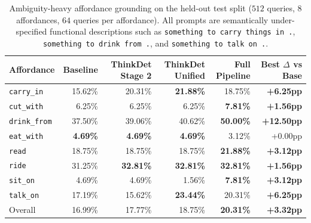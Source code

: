 \begin{table}[t]
\centering
\caption{Ambiguity-heavy affordance grounding on the held-out test split (\(512\) queries, \(8\) affordances, \(64\) queries per affordance). All prompts are semantically under-specified functional descriptions such as \texttt{something to carry things in .}, \texttt{something to drink from .}, and \texttt{something to talk on .}.}
\label{tab:ambiguity-affordance}
\begin{tabular}{lrrrrr}
\toprule
Affordance & Baseline & ThinkDet Stage 2 & ThinkDet Unified & Full Pipeline & Best \(\Delta\) vs Base \\
\midrule
\texttt{carry\_in}   & 15.62\% & 20.31\% & \textbf{21.88\%} & 18.75\% & \textbf{+6.25pp} \\
\texttt{cut\_with}   &  6.25\% &  6.25\% &  6.25\% & \textbf{7.81\%} & \textbf{+1.56pp} \\
\texttt{drink\_from} & 37.50\% & 39.06\% & 40.62\% & \textbf{50.00\%} & \textbf{+12.50pp} \\
\texttt{eat\_with}   & \textbf{4.69\%} & \textbf{4.69\%} & \textbf{4.69\%} & 3.12\% & +0.00pp \\
\texttt{read}        & 18.75\% & 18.75\% & 18.75\% & \textbf{21.88\%} & \textbf{+3.12pp} \\
\texttt{ride}        & 31.25\% & \textbf{32.81\%} & \textbf{32.81\%} & \textbf{32.81\%} & \textbf{+1.56pp} \\
\texttt{sit\_on}     &  4.69\% &  4.69\% &  1.56\% & \textbf{7.81\%} & \textbf{+3.12pp} \\
\texttt{talk\_on}    & 17.19\% & 15.62\% & \textbf{23.44\%} & 20.31\% & \textbf{+6.25pp} \\
\midrule
Overall & 16.99\% & 17.77\% & 18.75\% & \textbf{20.31\%} & \textbf{+3.32pp} \\
\bottomrule
\end{tabular}
\end{table}
